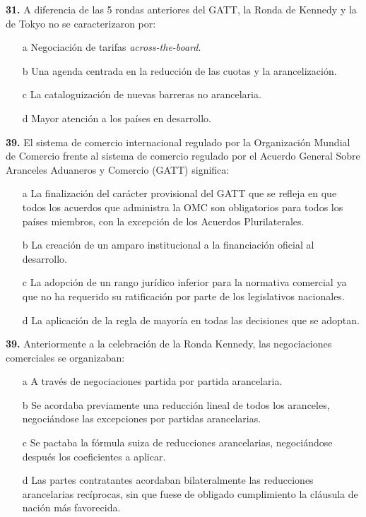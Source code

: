 \documentclass{nuevotema}
\begin{document}

\textbf{31.} A diferencia de las 5 rondas anteriores del GATT, la Ronda de Kennedy y la de Tokyo no se caracterizaron por:

\begin{itemize}
	\item[a] Negociación de tarifas \textit{across-the-board}.
	\item[b] Una agenda centrada en la reducción de las cuotas y la arancelización.
	\item[c] La cataloguización de nuevas barreras no arancelaria.
	\item[d] Mayor atención a los países en desarrollo.
\end{itemize}


\textbf{39.} El sistema de comercio internacional regulado por la Organización Mundial de Comercio frente al sistema de comercio regulado por el Acuerdo General Sobre Aranceles Aduaneros y Comercio (GATT) significa:

\begin{itemize}
	\item[a] La finalización del carácter provisional del GATT que se refleja en que todos los acuerdos que administra la OMC son obligatorios para todos los países miembros, con la excepción de los Acuerdos Plurilaterales.
	\item[b] La creación de un amparo institucional a la financiación oficial al desarrollo.
	\item[c] La adopción de un rango jurídico inferior para la normativa comercial ya que no ha requerido su ratificación por parte de los legislativos nacionales.
	\item[d] La aplicación de la regla de mayoría en todas las decisiones que se adoptan.
\end{itemize}


\textbf{39.} Anteriormente a la celebración de la Ronda Kennedy, las negociaciones comerciales se organizaban:

\begin{itemize}
	\item[a] A través de negociaciones partida por partida arancelaria.
	\item[b] Se acordaba previamente una reducción lineal de todos los aranceles, negociándose las excepciones por partidas arancelarias.
	\item[c] Se pactaba la fórmula suiza de reducciones arancelarias, negociándose después los coeficientes a aplicar.
	\item[d] Las partes contratantes acordaban bilateralmente las reducciones arancelarias recíprocas, sin que fuese de obligado cumplimiento la cláusula de nación más favorecida.
\end{itemize}
\end{document}
